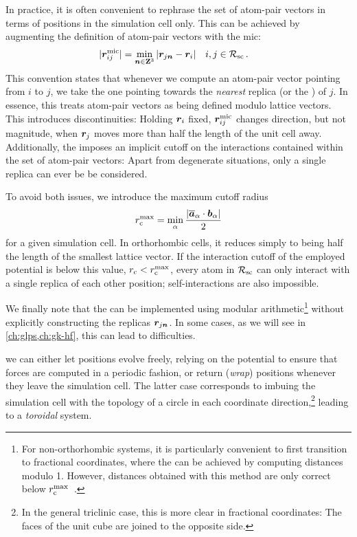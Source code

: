 In practice, it is often convenient to rephrase the set of atom-pair vectors in terms of positions in the simulation cell only. This can be achieved by augmenting the definition of atom-pair vectors with the \gls{mic}:
\begin{align}
	\magnitude{\Rm_{ij}} &= \min_{\offset \in \wholes^3} \magnitude{\R_{j\offset} - \R_i} \quad i,j \in \Rsc \, . \label{eq:pbc_mic}
\end{align}
This convention states that whenever we compute an atom-pair vector pointing from $i$ to $j$, we take the one pointing towards the \emph{nearest} replica (or the ) of $j$.
In essence, this treats atom-pair vectors as being defined modulo lattice vectors.
This introduces discontinuities: Holding $\boldsymbol{r}_i$ fixed, $\boldsymbol{r}^{\text{mic}}_{ij}$ changes direction, but not magnitude, when $\boldsymbol{r}_j$ moves more than half the length of the unit cell away.
Additionally, the \mic imposes an implicit cutoff on the interactions contained within the set of atom-pair vectors: Apart from degenerate situations, only a single replica can ever be be considered.

To avoid both issues, we introduce the maximum cutoff radius
\begin{equation}
	\maxcutoff = \min_\alpha \frac{\magnitude{\recipn_\alpha \cdot \basis_\alpha}}{2} \label{eq:pbc_maxcutoff}
\end{equation}
for a given simulation cell. In orthorhombic cells, it reduces simply to being half the length of the smallest lattice vector. If the interaction cutoff of the employed potential is below this value, $r_{\text{c}} < r_{\text{c}}^{\text{max}}$, every atom in $\mathcal{R_{\text{sc}}}$ can only interact with a single replica of each other position; self-interactions are also impossible.

We finally note that the \mic can be implemented using modular arithmetic\footnote{For non-orthorhombic systems, it is particularly convenient to first transition to fractional coordinates, where the \mic can be achieved by computing distances modulo 1. However, \mic distances obtained with this method are only correct below $r_{\text{c}}^{\text{max}}$~\cite{smith1989}.} without explicitly constructing the replicas $\boldsymbol{r}_{j\boldsymbol{n}}$. In some cases, as we will see in \cref{ch:glps,ch:gk-hf}, this can lead to difficulties.

 we can either let positions evolve freely, relying on the potential to ensure that forces are computed in a periodic fashion, or return (\emph{wrap}) positions whenever they leave the simulation cell. The latter case corresponds to imbuing the simulation cell with the topology of a circle in each coordinate direction,\footnote{In the general triclinic case, this is more clear in fractional coordinates: The faces of the unit cube are joined to the opposite side.} leading to a \emph{toroidal} system.

